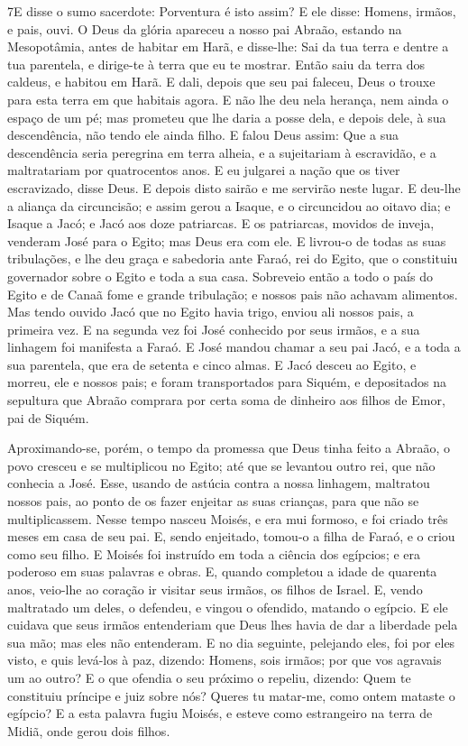 \lettrine{7} E disse o sumo sacerdote: Porventura é isto
assim? E ele disse: Homens, irmãos, e pais, ouvi. O Deus da
glória apareceu a nosso pai Abraão, estando na Mesopotâmia, antes de
habitar em Harã, e disse-lhe: Sai da tua terra e dentre a tua
parentela, e dirige-te à terra que eu te mostrar. Então saiu da
terra dos caldeus, e habitou em Harã. E dali, depois que seu pai
faleceu, Deus o trouxe para esta terra em que habitais agora. E
não lhe deu nela herança, nem ainda o espaço de um pé; mas prometeu
que lhe daria a posse dela, e depois dele, à sua descendência, não
tendo ele ainda filho. E falou Deus assim: Que a sua
descendência seria peregrina em terra alheia, e a sujeitariam à
escravidão, e a maltratariam por quatrocentos anos. E eu
julgarei a nação que os tiver escravizado, disse Deus. E depois
disto sairão e me servirão neste lugar. E deu-lhe a aliança da
circuncisão; e assim gerou a Isaque, e o circuncidou ao oitavo dia;
e Isaque a Jacó; e Jacó aos doze patriarcas. E os patriarcas,
movidos de inveja, venderam José para o Egito; mas Deus era com ele.
E livrou-o de todas as suas tribulações, e lhe deu graça e
sabedoria ante Faraó, rei do Egito, que o constituiu governador
sobre o Egito e toda a sua casa. Sobreveio então a todo o
país do Egito e de Canaã fome e grande tribulação; e nossos pais não
achavam alimentos. Mas tendo ouvido Jacó que no Egito havia
trigo, enviou ali nossos pais, a primeira vez. E na segunda
vez foi José conhecido por seus irmãos, e a sua linhagem foi
manifesta a Faraó. E José mandou chamar a seu pai Jacó, e a
toda a sua parentela, que era de setenta e cinco almas. E
Jacó desceu ao Egito, e morreu, ele e nossos pais; e foram
transportados para Siquém, e depositados na sepultura que Abraão
comprara por certa soma de dinheiro aos filhos de Emor, pai de
Siquém.

Aproximando-se, porém, o tempo da promessa que Deus tinha feito a
Abraão, o povo cresceu e se multiplicou no Egito; até que se
levantou outro rei, que não conhecia a José. Esse, usando de
astúcia contra a nossa linhagem, maltratou nossos pais, ao ponto de
os fazer enjeitar as suas crianças, para que não se multiplicassem.
Nesse tempo nasceu Moisés, e era mui formoso, e foi criado
três meses em casa de seu pai. E, sendo enjeitado, tomou-o a
filha de Faraó, e o criou como seu filho. E Moisés foi
instruído em toda a ciência dos egípcios; e era poderoso em suas
palavras e obras. E, quando completou a idade de quarenta
anos, veio-lhe ao coração ir visitar seus irmãos, os filhos de
Israel. E, vendo maltratado um deles, o defendeu, e vingou o
ofendido, matando o egípcio. E ele cuidava que seus irmãos
entenderiam que Deus lhes havia de dar a liberdade pela sua mão; mas
eles não entenderam. E no dia seguinte, pelejando eles, foi
por eles visto, e quis levá-los à paz, dizendo: Homens, sois irmãos;
por que vos agravais um ao outro? E o que ofendia o seu
próximo o repeliu, dizendo: Quem te constituiu príncipe e juiz sobre
nós? Queres tu matar-me, como ontem mataste o egípcio?
E a esta palavra fugiu Moisés, e esteve como estrangeiro na
terra de Midiã, onde gerou dois filhos.

